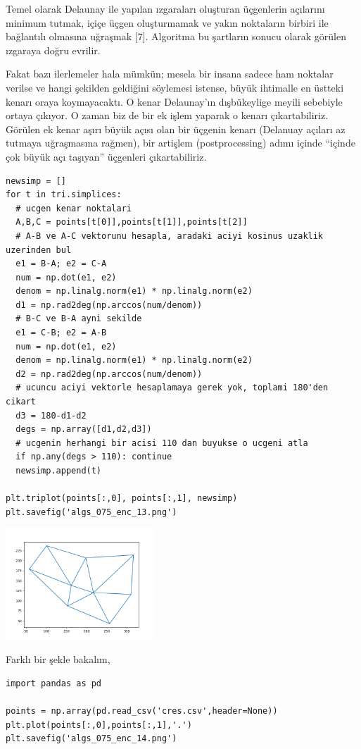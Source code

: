 \documentclass[12pt,fleqn]{article}\usepackage{../../common}
\begin{document}
Temel olarak Delaunay ile yapılan ızgaraları oluşturan üçgenlerin açılarını
minimum tutmak, içiçe üçgen oluşturmamak ve yakın noktaların birbiri ile
bağlantılı olmasına uğraşmak [7]. Algoritma bu şartların sonucu olarak görülen
ızgaraya doğru evrilir.

Fakat bazı ilerlemeler hala mümkün; mesela bir insana sadece ham noktalar
verilse ve hangi şekilden geldiğini söylemesi istense, büyük ihtimalle en
üstteki kenarı oraya koymayacaktı. O kenar Delaunay'ın dışbükeylige meyili
sebebiyle ortaya çıkıyor. O zaman biz de bir ek işlem yaparak o kenarı
çıkartabiliriz. Görülen ek kenar aşırı büyük açısı olan bir üçgenin kenarı
(Delanuay açıları az tutmaya uğraşmasına rağmen), bir artişlem (postprocessing)
adımı içinde ``içinde çok büyük açı taşıyan'' üçgenleri çıkartabiliriz.

\begin{verbatim}
newsimp = []
for t in tri.simplices:
  # ucgen kenar noktalari
  A,B,C = points[t[0]],points[t[1]],points[t[2]]
  # A-B ve A-C vektorunu hesapla, aradaki aciyi kosinus uzaklik uzerinden bul
  e1 = B-A; e2 = C-A
  num = np.dot(e1, e2)
  denom = np.linalg.norm(e1) * np.linalg.norm(e2)
  d1 = np.rad2deg(np.arccos(num/denom))
  # B-C ve B-A ayni sekilde
  e1 = C-B; e2 = A-B
  num = np.dot(e1, e2)
  denom = np.linalg.norm(e1) * np.linalg.norm(e2)
  d2 = np.rad2deg(np.arccos(num/denom))
  # ucuncu aciyi vektorle hesaplamaya gerek yok, toplami 180'den cikart
  d3 = 180-d1-d2
  degs = np.array([d1,d2,d3])
  # ucgenin herhangi bir acisi 110 dan buyukse o ucgeni atla
  if np.any(degs > 110): continue
  newsimp.append(t)

plt.triplot(points[:,0], points[:,1], newsimp)
plt.savefig('algs_075_enc_13.png')
\end{verbatim}

\includegraphics[width=15em]{algs_075_enc_13.png}

Farklı bir şekle bakalım,

\begin{verbatim}
import pandas as pd

points = np.array(pd.read_csv('cres.csv',header=None))
plt.plot(points[:,0],points[:,1],'.')
plt.savefig('algs_075_enc_14.png')
\end{verbatim}
\end{document}
